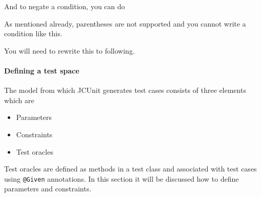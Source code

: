 And to negate a condition, you can do

\begin{Shaded}
\begin{Highlighting}[]
      \NormalTok{(\{}\NormalTok{, }\NormalTok{\})}
        
\end{Highlighting}
\end{Shaded}

As mentioned already, parentheses are not supported and you cannot write
a condition like this.

\begin{Shaded}
\begin{Highlighting}[]

   \NormalTok{(}\NormalTok{)}
\end{Highlighting}
\end{Shaded}

You will need to rewrite this to following.

\begin{Shaded}
\begin{Highlighting}[]

   \NormalTok{(\{}\NormalTok{, }\NormalTok{\})}
\end{Highlighting}
\end{Shaded}

\paragraph{Defining a test space}\label{defining-a-test-space}

The model from which JCUnit generates test cases consists of three
elements which are

\begin{itemize}
\tightlist
\item
  Parameters
\item
  Constraints
\item
  Test oracles
\end{itemize}

Test oracles are defined as methods in a test class and associated with
test cases using \texttt{@Given} annotations. In this section it will be
discussed how to define parameters and constraints.

